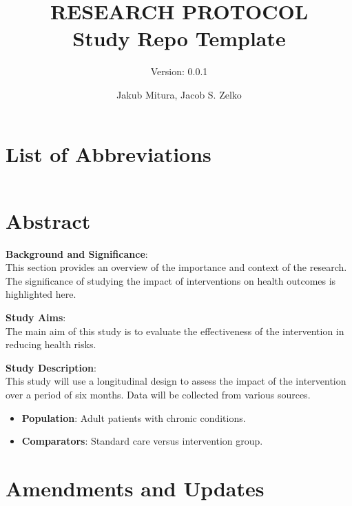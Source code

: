 \documentclass[12pt]{article}
\title{RESEARCH PROTOCOL\\Study Repo Template}
\subtitle{Version: 0.0.1}
\author{Jakub Mitura, Jacob S. Zelko}
\date{\vspace{-2.5em}}
\begin{document}
\maketitle

\tableofcontents

\section{List of Abbreviations}
\label{list-of-abbreviations}

\begin{table}[!h]
\centering\begingroup\fontsize{8}{10}\selectfont
\begin{tabular}{ll}
\toprule
\cellcolor{gray!10}{CDM} & \cellcolor{gray!10}{Common data model}\\
\bottomrule
\end{tabular}
\endgroup{}
\end{table}

\section{Abstract}
\label{abstract}

\textbf{Background and Significance}:\\
This section provides an overview of the importance and context of the research. The significance of studying the impact of interventions on health outcomes is highlighted here. \cite{Schuemie2018-zi}

\textbf{Study Aims}:\\
The main aim of this study is to evaluate the effectiveness of the intervention in reducing health risks.

\textbf{Study Description}:\\
This study will use a longitudinal design to assess the impact of the intervention over a period of six months. Data will be collected from various sources.

\begin{itemize}
  \item \textbf{Population}: Adult patients with chronic conditions.
  \item \textbf{Comparators}: Standard care versus intervention group.
\end{itemize}

\section{Amendments and Updates}
\label{amendments-and-updates}
\end{document}
